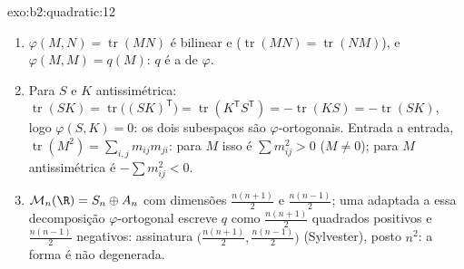 \begin{solution}{exo:b2:quadratic:12}
\begin{enumerate}
  \item $\varphi(M, N) = \operatorname{tr}(MN)$ é bilinear e
         ($\operatorname{tr}(MN) =
        \operatorname{tr}(NM)$), e $\varphi(M, M) = q(M)$:
        $q$ é a  de $\varphi$.
  \item Para $S$  e $K$ antissimétrica:
        $\operatorname{tr}(SK) =
        \operatorname{tr}\bigl((SK)^{\mathsf T}\bigr) =
        \operatorname{tr}(K^{\mathsf T}S^{\mathsf T}) =
        -\operatorname{tr}(KS) = -\operatorname{tr}(SK)$, logo
        $\varphi(S, K) = 0$: os dois subespaços são
        $\varphi$-ortogonais. Entrada a entrada, $\operatorname{tr}
        (M^2) = \sum_{i,j} m_{ij}m_{ji}$: para $M$ 
        isso é $\sum m_{ij}^2 > 0$ ($M \neq 0$); para
        $M$ antissimétrica é $-\sum m_{ij}^2 < 0$.
  \item $\mathcal M_n(\R) = S_n \oplus A_n$ com dimensões
        $\frac{n(n+1)}2$ e $\frac{n(n-1)}2$; uma  adaptada a essa decomposição $\varphi$-ortogonal
        escreve $q$ como $\frac{n(n+1)}2$ quadrados positivos e
        $\frac{n(n-1)}2$ negativos: assinatura
        $\bigl(\frac{n(n+1)}2, \frac{n(n-1)}2\bigr)$
        (Sylvester), posto $n^2$: a forma é não degenerada.
\end{enumerate}
\end{solution}

